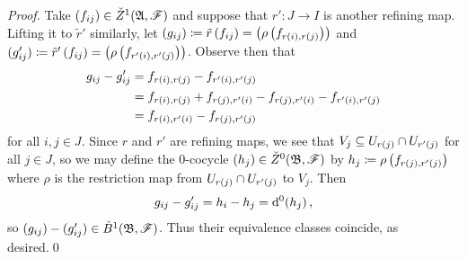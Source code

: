 \documentclass[../Moduli_Spaces_of_Riemann_Surfaces.tex]{subfiles}
\begin{document}
    \begin{proof}
        Take $\left(f_{ij}\right)\in\check{Z}^1\!\left(\mathfrak{A},\mathscr{F}\right)$ and suppose that $r':J\to I$ is another refining map. Lifting it to $\tilde{r}'$ similarly, let $\left(g_{ij}\right)\coloneqq\tilde{r}\left(f_{ij}\right)=\left(\rho\left(f_{r\left(i\right),r\left(j\right)}\right)\right)$ and $(g'_{ij})\coloneqq\tilde{r}'\left(f_{ij}\right)=\left(\rho\left(f_{r'\left(i\right),r'\left(j\right)}\right)\right)$. Observe then that
        \begin{equation*}
            \begin{aligned}
                g_{ij}-g_{ij}'&=f_{r\left(i\right),r\left(j\right)}-f_{r'\left(i\right),r'\left(j\right)} \\
                              &=f_{r\left(i\right),r\left(j\right)}+f_{r\left(j\right),r'\left(i\right)}-f_{r\left(j\right),r'\left(i\right)}-f_{r'\left(i\right),r'\left(j\right)} \\
                              &=f_{r\left(i\right),r'\left(i\right)}-f_{r\left(j\right),r'\left(j\right)}
            \end{aligned}
        \end{equation*}
        for all $i,j\in J$. Since $r$ and $r'$ are refining maps, we see that $V_j\subseteq U_{r\left(j\right)}\cap U_{r'\left(j\right)}$ for all $j\in J$, so we may define the $0$-cocycle $\left(h_j\right)\in\check{Z}^0\!\left(\mathfrak{B},\mathscr{F}\right)$ by $h_j\coloneqq\rho\left(f_{r\left(j\right),r'\left(j\right)}\right)$ where $\rho$ is the restriction map from $U_{r\left(j\right)}\cap U_{r'\left(j\right)}$ to $V_j$. Then
        \begin{equation*}
            g_{ij}-g_{ij}'=h_i-h_j=\mathrm{d}^0\!\left(h_j\right),
        \end{equation*}
        so $\left(g_{ij}\right)-(g_{ij}')\in\check{B}^1\!\left(\mathfrak{B},\mathscr{F}\right)$. Thus their equivalence classes coincide, as desired.\qed
    \end{proof}
\end{document}
